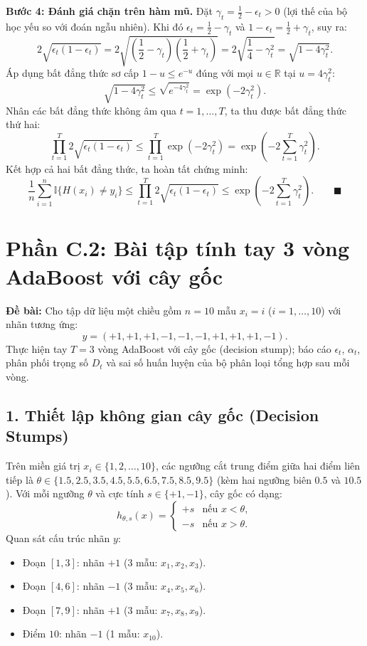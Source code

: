 \documentclass[11pt, a4paper]{article}
\begin{document}
\textbf{Bước 4: Đánh giá chặn trên hàm mũ.}
Đặt $\gamma_t = \frac{1}{2} - \epsilon_t > 0$ (lợi thế của bộ học yếu so với đoán ngẫu nhiên). Khi đó $\epsilon_t = \frac{1}{2} - \gamma_t$ và $1 - \epsilon_t = \frac{1}{2} + \gamma_t$, suy ra:
\[
2\sqrt{\epsilon_t(1 - \epsilon_t)} = 2\sqrt{\left(\frac{1}{2} - \gamma_t\right)\left(\frac{1}{2} + \gamma_t\right)} = 2\sqrt{\frac{1}{4} - \gamma_t^2} = \sqrt{1 - 4\gamma_t^2}.
\]
Áp dụng bất đẳng thức sơ cấp $1 - u \le e^{-u}$ đúng với mọi $u \in \mathbb{R}$ tại $u = 4\gamma_t^2$:
\[
\sqrt{1 - 4\gamma_t^2} \le \sqrt{e^{-4\gamma_t^2}} = \exp(-2\gamma_t^2).
\]
Nhân các bất đẳng thức không âm qua $t = 1, \dots, T$, ta thu được bất đẳng thức thứ hai:
\[
\prod_{t=1}^{T} 2\sqrt{\epsilon_t(1 - \epsilon_t)} \le \prod_{t=1}^{T} \exp(-2\gamma_t^2) = \exp\left(-2\sum_{t=1}^{T}\gamma_t^2\right).
\]
Kết hợp cả hai bất đẳng thức, ta hoàn tất chứng minh:
\[
\frac{1}{n}\sum_{i=1}^{n} \mathbb{I}\{H(x_i) \ne y_i\} \le \prod_{t=1}^{T} 2\sqrt{\epsilon_t(1 - \epsilon_t)} \le \exp\left(-2\sum_{t=1}^{T}\gamma_t^2\right). \qquad \blacksquare
\]

\newpage

\section*{Phần C.2: Bài tập tính tay 3 vòng AdaBoost với cây gốc}

\textbf{Đề bài:} Cho tập dữ liệu một chiều gồm $n = 10$ mẫu $x_i = i$ ($i = 1, \dots, 10$) với nhãn tương ứng:
\[
y = (+1, +1, +1, -1, -1, -1, +1, +1, +1, -1).
\]
Thực hiện tay $T = 3$ vòng AdaBoost với cây gốc (decision stump); báo cáo $\epsilon_t$, $\alpha_t$, phân phối trọng số $D_t$ và sai số huấn luyện của bộ phân loại tổng hợp sau mỗi vòng.

\subsection*{1. Thiết lập không gian cây gốc (Decision Stumps)}

Trên miền giá trị $x_i \in \{1, 2, \dots, 10\}$, các ngưỡng cắt trung điểm giữa hai điểm liên tiếp là $\theta \in \{1.5, 2.5, 3.5, 4.5, 5.5, 6.5, 7.5, 8.5, 9.5\}$ (kèm hai ngưỡng biên $0.5$ và $10.5$). Với mỗi ngưỡng $\theta$ và cực tính $s \in \{+1, -1\}$, cây gốc có dạng:
\[
h_{\theta, s}(x) = \begin{cases} +s & \text{nếu } x < \theta, \\ -s & \text{nếu } x > \theta. \end{cases}
\]
Quan sát cấu trúc nhãn $y$:
\begin{itemize}
    \item Đoạn $[1, 3]$: nhãn $+1$ (3 mẫu: $x_1, x_2, x_3$).
    \item Đoạn $[4, 6]$: nhãn $-1$ (3 mẫu: $x_4, x_5, x_6$).
    \item Đoạn $[7, 9]$: nhãn $+1$ (3 mẫu: $x_7, x_8, x_9$).
    \item Điểm $10$: nhãn $-1$ (1 mẫu: $x_{10}$).
\end{itemize}
\end{document}
